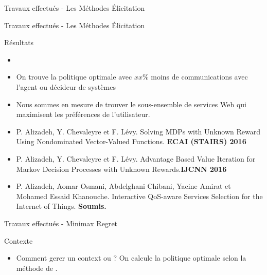 \documentclass{beamer}
\newcommand{\imp}[1]{{\color{red}{#1}}}
\begin{document}
{{\begin{frame}{Travaux effectués - Les Méthodes Élicitation}
\end{frame}


\begin{frame}{Travaux effectués - Les Méthodes Élicitation}

\begin{block}{Résultats}
\begin{itemize}
\item
\item On trouve la politique optimale avec $xx \% $  moins de communications avec l’agent ou décideur de
systèmes
\item Nous sommes en mesure de trouver le sous-ensemble de services Web qui maximisent les préférences de l'utilisateur.
\end{itemize}
\end{block}

\begin{itemize}
\small
\item P. Alizadeh, Y. Chevaleyre et F. Lévy. Solving MDPs with Unknown Reward Using Nondominated Vector-Valued Functions. \textbf{ECAI (STAIRS) 2016}
\item P. Alizadeh, Y. Chevaleyre et F. Lévy. Advantage Based Value Iteration for Markov Decision Processes with Unknown Rewards.\textbf{IJCNN 2016}
\item P. Alizadeh, Aomar Osmani, Abdelghani Chibani, Yacine Amirat et Mohamed Essaid Khanouche. Interactive QoS-aware Services Selection for the Internet of Things. \textbf{Soumis.}
\end{itemize}


\end{frame}



\begin{frame}{Travaux effectués - Minimax Regret }

\begin{block}{Contexte}
\begin{itemize}
\item Comment gerer un context ou \imp{les récompenses sont incertaines}? On calcule la politique optimale selon la méthode de \imp{minimax regret}.
\end{itemize}
\end{block}



\end{frame}}}
\end{document}
